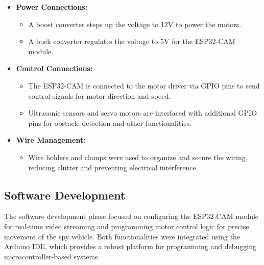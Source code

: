 \documentclass[12pt,a4paper]{report}
\begin{document}
\begin{enumerate}
\begin{itemize}
    \item \textbf{Power Connections:}
    \begin{itemize}
        \item A boost converter steps up the voltage to 12V to power the motors.
        \item A buck converter regulates the voltage to 5V for the ESP32-CAM module.
    \end{itemize}
    
    \item \textbf{Control Connections:}
    \begin{itemize}
        \item The ESP32-CAM is connected to the motor driver via GPIO pins to send control signals for motor direction and speed.
        \item Ultrasonic sensors and servo motors are interfaced with additional GPIO pins for obstacle detection and other functionalities.
    \end{itemize}
    
    \item \textbf{Wire Management:}
    \begin{itemize}
        \item Wire holders and clamps were used to organize and secure the wiring, reducing clutter and preventing electrical interference.
    \end{itemize}
\end{itemize}


\end{enumerate}


\label{Software Development}
\subsection{Software Development}

The software development phase focused on configuring the ESP32-CAM module for real-time video streaming and programming motor control logic for precise movement of the spy vehicle. Both functionalities were integrated using the Arduino IDE, which provides a robust platform for programming and debugging microcontroller-based systems.
\end{document}
